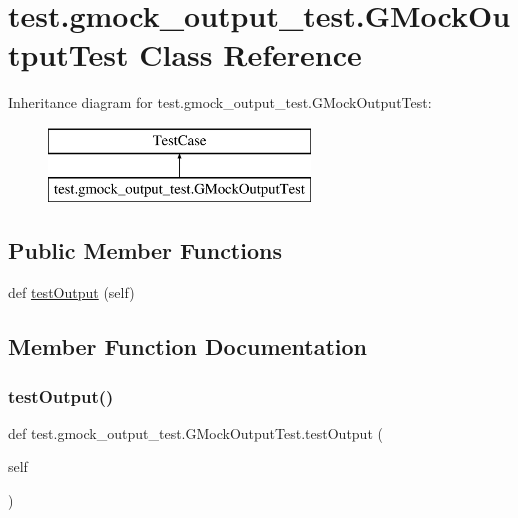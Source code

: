 \hypertarget{classtest_1_1gmock__output__test_1_1_g_mock_output_test}{}\section{test.\+gmock\+\_\+output\+\_\+test.\+G\+Mock\+Output\+Test Class Reference}
\label{classtest_1_1gmock__output__test_1_1_g_mock_output_test}
Inheritance diagram for test.\+gmock\+\_\+output\+\_\+test.\+G\+Mock\+Output\+Test\+:\begin{figure}[H]
\begin{center}
\leavevmode
\includegraphics[height=2.000000cm]{d4/d5b/classtest_1_1gmock__output__test_1_1_g_mock_output_test}
\end{center}
\end{figure}
\subsection*{Public Member Functions}
\begin{DoxyCompactItemize}
\item 
def \mbox{\hyperlink{classtest_1_1gmock__output__test_1_1_g_mock_output_test_a302b0efd122995f474a0ea4552367836}{test\+Output}} (self)
\end{DoxyCompactItemize}


\subsection{Member Function Documentation}
\mbox{\label{classtest_1_1gmock__output__test_1_1_g_mock_output_test_a302b0efd122995f474a0ea4552367836}} 
\subsubsection{\texorpdfstring{testOutput()}{testOutput()}}
{\footnotesize\ttfamily def test.\+gmock\+\_\+output\+\_\+test.\+G\+Mock\+Output\+Test.\+test\+Output (\begin{DoxyParamCaption}\item[{}]{self }\end{DoxyParamCaption})}



